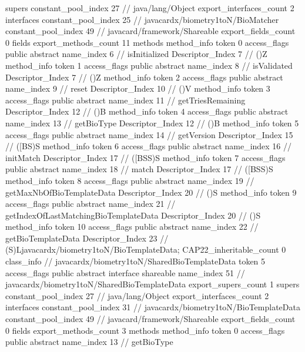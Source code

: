 {{{			supers {
				constant_pool_index	27		// java/lang/Object
			}
			export_interfaces_count	2
			interfaces {
				constant_pool_index	25		// javacardx/biometry1toN/BioMatcher
				constant_pool_index	49		// javacard/framework/Shareable
			}
			export_fields_count	0
			fields {
			}
			export_methods_count	11
			methods {
				method_info {
					token	0
					access_flags	public abstract
					name_index	6		// isInitialized
					Descriptor_Index	7		// ()Z
				}
				method_info {
					token	1
					access_flags	public abstract
					name_index	8		// isValidated
					Descriptor_Index	7		// ()Z
				}
				method_info {
					token	2
					access_flags	public abstract
					name_index	9		// reset
					Descriptor_Index	10		// ()V
				}
				method_info {
					token	3
					access_flags	public abstract
					name_index	11		// getTriesRemaining
					Descriptor_Index	12		// ()B
				}
				method_info {
					token	4
					access_flags	public abstract
					name_index	13		// getBioType
					Descriptor_Index	12		// ()B
				}
				method_info {
					token	5
					access_flags	public abstract
					name_index	14		// getVersion
					Descriptor_Index	15		// ([BS)S
				}
				method_info {
					token	6
					access_flags	public abstract
					name_index	16		// initMatch
					Descriptor_Index	17		// ([BSS)S
				}
				method_info {
					token	7
					access_flags	public abstract
					name_index	18		// match
					Descriptor_Index	17		// ([BSS)S
				}
				method_info {
					token	8
					access_flags	public abstract
					name_index	19		// getMaxNbOfBioTemplateData
					Descriptor_Index	20		// ()S
				}
				method_info {
					token	9
					access_flags	public abstract
					name_index	21		// getIndexOfLastMatchingBioTemplateData
					Descriptor_Index	20		// ()S
				}
				method_info {
					token	10
					access_flags	public abstract
					name_index	22		// getBioTemplateData
					Descriptor_Index	23		// (S)Ljavacardx/biometry1toN/BioTemplateData;
				}
			}
			CAP22_inheritable_count	0
		}
		class_info {		// javacardx/biometry1toN/SharedBioTemplateData
			token	5
			access_flags	public abstract interface shareable
			name_index	51		// javacardx/biometry1toN/SharedBioTemplateData
			export_supers_count	1
			supers {
				constant_pool_index	27		// java/lang/Object
			}
			export_interfaces_count	2
			interfaces {
				constant_pool_index	31		// javacardx/biometry1toN/BioTemplateData
				constant_pool_index	49		// javacard/framework/Shareable
			}
			export_fields_count	0
			fields {
			}
			export_methods_count	3
			methods {
				method_info {
					token	0
					access_flags	public abstract
					name_index	13		// getBioType
}}}}}
